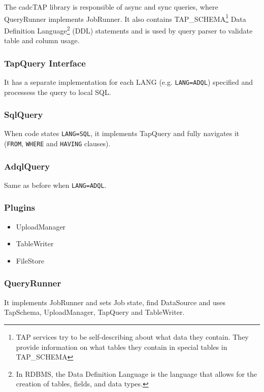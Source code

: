 The cadcTAP library is responsible of async and sync queries, where QueryRunner implements JobRunner. It also contains TAP\_SCHEMA\footnote{TAP services try to be self-describing about what data they contain. They provide information on what tables they contain in special tables in TAP\_SCHEMA}
Data Definition Language\footnote{In RDBMS, the Data Definition Language is the language that allows for the creation of tables, fields, and data types.} (DDL) %
statements and is used by query parser to validate table and column usage.

\subsubsection{TapQuery Interface}

It has a separate implementation for each LANG (e.g. \texttt{LANG=ADQL}) specified and processess the query to local SQL.

\subsubsection{SqlQuery}

When code states \texttt{LANG=SQL}, it implements TapQuery and fully navigates it (\texttt{FROM}, \texttt{WHERE} and \texttt{HAVING} clauses).

\subsubsection{AdqlQuery}

Same as before when \texttt{LANG=ADQL}.

\subsubsection{Plugins}

\begin{itemize}
\item UploadManager
\item TableWriter
\item FileStore
\end{itemize}


\subsubsection{QueryRunner}

It implements JobRunner and sets Job state, find DataSource and uses TapSchema, UploadManager, TapQuery and TableWriter.

